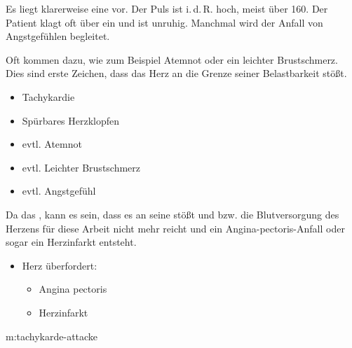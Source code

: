 {Es liegt klarerweise eine  vor. Der Puls
ist i.\,d.\,R. hoch, meist über 160\PerMin*. Der Patient
klagt oft über ein  und ist unruhig. Manchmal wird der Anfall von
Angstgefühlen begleitet.

Oft kommen  dazu, wie zum Beispiel Atemnot oder ein leichter
Brustschmerz. Dies sind erste Zeichen, dass das Herz an
die Grenze seiner Belastbarkeit stößt.\bigskip
}{
\begin{itemize}
  \item Tachykardie
  \item Spürbares Herzklopfen
  \item evtl. Atemnot
  \item evtl. Leichter Brustschmerz
  \item evtl. Angstgefühl
\end{itemize}
}{}{}{}

{%
Da das ,
kann es sein, dass es an seine  stößt und
 bzw. die Blutversorgung des Herzens für diese
Arbeit nicht mehr reicht und ein Angina-pectoris-Anfall oder
sogar ein Herzinfarkt entsteht.

\bigskip
}{
\begin{itemize}
  \item Herz überfordert:
  \begin{itemize}
    \item Angina pectoris
    \item Herzinfarkt
  \end{itemize}
\end{itemize}
}{}{}{}



{m:tachykarde-attacke}
{}{}

